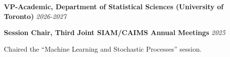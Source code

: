 \vspace*{10pt}

\vspace{8pt}
\noindent
\textbf{VP-Academic, Department of Statistical Sciences (University of Toronto)} \hfill\textit{2026-2027}\par


\vspace{8pt}
\noindent
\textbf{Session Chair, Third Joint SIAM/CAIMS Annual Meetings}
\hfill \textit{2025}\par
\vspace{3pt}
\noindent
Chaired the ``Machine Learning and Stochastic Processes'' session.\par
